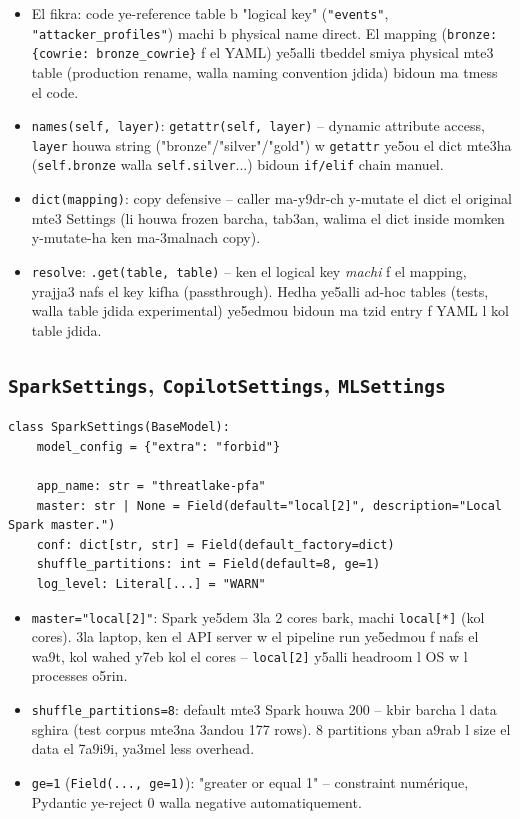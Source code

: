 \documentclass[11pt,a4paper]{report}
\DeclareRobustCommand{\code}[1]{\texttt{#1}}
\begin{document}
\begin{itemize}
  \item El fikra: code ye-reference table b "logical key" (\code{"events"},
        \code{"attacker\_profiles"}) machi b physical name direct. El mapping
        (\code{bronze: \{cowrie: bronze\_cowrie\}} f el YAML) ye5alli tbeddel
        smiya physical mte3 table (production rename, walla naming convention
        jdida) bidoun ma tmess el code.
  \item \code{names(self, layer)}: \code{getattr(self, layer)} -- dynamic
        attribute access, \code{layer} houwa string ("bronze"/"silver"/"gold")
        w \code{getattr} ye5ou el dict mte3ha (\code{self.bronze} walla
        \code{self.silver}...) bidoun \code{if/elif} chain manuel.
  \item \code{dict(mapping)}: copy defensive -- caller ma-y9dr-ch y-mutate el
        dict el original mte3 Settings (li houwa frozen barcha, tab3an, walima
        el dict inside momken y-mutate-ha ken ma-3malnach copy).
  \item \code{resolve}: \code{.get(table, table)} -- ken el logical key
        \emph{machi} f el mapping, yrajja3 nafs el key kifha (passthrough). Hedha
        ye5alli ad-hoc tables (tests, walla table jdida experimental) ye5edmou
        bidoun ma tzid entry f YAML l kol table jdida.
\end{itemize}

\subsection{\code{SparkSettings}, \code{CopilotSettings}, \code{MLSettings}}

\begin{lstlisting}[style=pystyle]
class SparkSettings(BaseModel):
    model_config = {"extra": "forbid"}

    app_name: str = "threatlake-pfa"
    master: str | None = Field(default="local[2]", description="Local Spark master.")
    conf: dict[str, str] = Field(default_factory=dict)
    shuffle_partitions: int = Field(default=8, ge=1)
    log_level: Literal[...] = "WARN"
\end{lstlisting}

\begin{itemize}
  \item \code{master="local[2]"}: Spark ye5dem 3la 2 cores bark, machi
        \code{local[*]} (kol cores). 3la laptop, ken el API server w el pipeline
        run ye5edmou f nafs el wa9t, kol wahed y7eb kol el cores -- \code{local[2]}
        y5alli headroom l OS w l processes o5rin.
  \item \code{shuffle\_partitions=8}: default mte3 Spark houwa 200 -- kbir
        barcha l data sghira (test corpus mte3na 3andou 177 rows). 8 partitions
        yban a9rab l size el data el 7a9i9i, ya3mel less overhead.
  \item \code{ge=1} (\code{Field(..., ge=1)}): "greater or equal 1" -- constraint
        numérique, Pydantic ye-reject 0 walla negative automatiquement.
\end{itemize}
\end{document}
